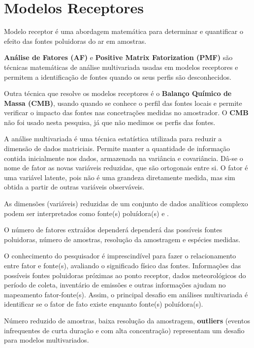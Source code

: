 \section{Modelos Receptores}

Modelo receptor é uma abordagem matemática para determinar e 
quantificar o efeito das fontes poluidoras do ar em amostras.

\textbf{Análise de Fatores (AF)} e 
\textbf{Positive Matrix Fatorization (PMF)} são técnicas matemáticas
de análise multivariada usadas em modelos receptores e 
permitem a identificação de fontes quando os seus perfis são desconhecidos.

Outra técnica que resolve os modelos receptores é 
o \textbf{Balanço Químico de Massa (CMB)}, usando quando se conhece 
o perfil das fontes locais e permite verificar o impacto das fontes 
nas concetrações medidas no amostrador. 
O \textbf{CMB} não foi usado nesta pesquisa, já que não medimos os perfis 
das fontes. 

A análise multivariada é uma técnica estatística utilizada para 
reduzir a dimensão de dados matriciais. 
Permite manter a quantidade de informação contida inicialmente nos dados, 
armazenada na variância e covariância. 
Dâ-se o nome de fator as novas variáveis reduzidas, que são
ortogonais entre si. 
O fator é uma variável latente, pois não é uma grandeza diretamente
medida, mas sim obtida a partir de outras variáveis observáveis. 

As dimensões (variáveis) reduzidas de um conjunto de dados analíticos 
complexo podem ser interpretados como fonte(s) poluídora(s) 
\citep{wang2012} e \citep{mansha2012}.

O número de fatores extraídos dependerá dependerá das possíveis 
fontes poluidoras, número de amostras, resolução da amostragem 
e espécies medidas.

O conhecimento do pesquisador é imprescindível para fazer o relacionamento 
entre fator e fonte(s), avaliando o significado físico das fontes. 
Informações das possíveis fontes poluidoras próximas ao ponto 
receptor, dados meteorológicos do período de coleta, inventário de emissões 
e outras informações ajudam no mapeamento fator-fonte(s).
Assim, o principal desafio em análises multivariada é identificar 
se o fator de fato existe enquanto fonte(s) poluídora(s). 

Número reduzido de amostras, baixa resolução da amostragem, \textbf{outliers} 
(eventos infrequentes de curta duração e com alta concentração) representam 
um desafio para modelos multivariados.

